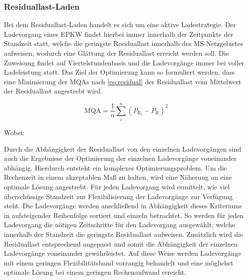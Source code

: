 \subsubsection{Residuallast-Laden}

Bei dem Residuallast-Laden handelt es sich um eine aktive Ladestrategie.
Der Ladevorgang eines \gls{EPKW} findet hierbei immer innerhalb der Zeitpunkte der Standzeit statt, welche die geringste Residuallast innerhalb des \gls{MS}-Netzgebietes aufweisen, wodurch eine Glättung der Residuallast erreicht werden soll.
Die Zuweisung findet auf Viertelstundenbasis und die Ladevorgänge immer bei voller Ladeleistung statt.
Das Ziel der Optimierung kann so formuliert werden, dass eine Minimierung der \glspl{MQA} nach \autoref{eq:residual} der Residuallast vom Mittelwert der Residuallast angestrebt wird.

\begin{equation}
	\text{MQA} = \frac{1}{n} \sum_i^n \left( P_{\text{R}_i} - \overline{P}_{\text{R}} \right)^2
	\label{eq:residual}
\end{equation}

\noindent Wobei:


Durch die Abhängigkeit der Residuallast von den einzelnen Ladevorgängen sind auch die Ergebnisse der Optimierung der einzelnen Ladevorgänge voneinander abhängig.
Hierdurch entsteht ein komplexes Optimierungsproblem.
Um die Rechenzeit in einem akzeptablen Maß zu halten, wird eine Näherung an eine optimale Lösung angestrebt.
Für jeden Ladevorgang wird ermittelt, wie viel überschüssige Standzeit zur Flexibilisierung der Ladevorgänge zur Verfügung steht.
Die Ladevorgänge werden anschließend in Abhängigkeit dieses Kriteriums in aufsteigender Reihenfolge sortiert und einzeln betrachtet.
So werden für jeden Ladevorgang die nötigen Zeitschritte für den Ladevorgang ausgewählt, welche innerhalb der Standzeit die geringste Residuallast aufweisen.
Zusätzlich wird die Residuallast entsprechend angepasst und somit die Abhängigkeit der einzelnen Ladevorgänge voneinander gewährleistet.
Auf diese Weise werden Ladevorgänge mit einem geringen Flexibilitätsband vorrangig behandelt und eine möglichst optimale Lösung bei einem geringen Rechenaufwand erreicht.



